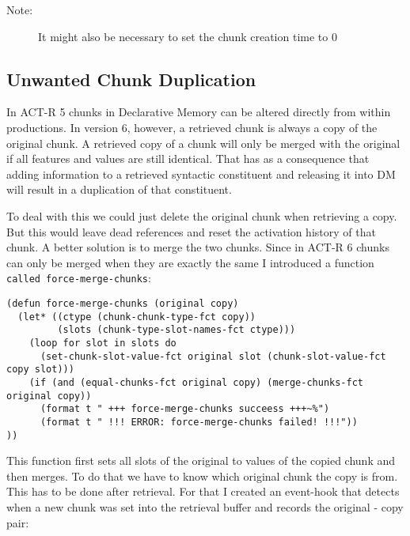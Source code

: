 \documentclass[nobf,fignum,doc,longtable]{apa}
\begin{document}
\begin{description}
\item[Note:] It might also be necessary to set the chunk creation time to 0
\end{description}

\subsection{Unwanted Chunk Duplication}
In ACT-R 5 chunks in Declarative Memory can be altered directly from within productions. In version 6, however, a retrieved chunk is always a copy of the original chunk. A retrieved copy of a chunk will only be merged with the original if all features and values are still identical. That has as a consequence that adding information to a retrieved syntactic constituent and releasing it into DM will result in a duplication of that constituent.

To deal with this we could just delete the original chunk when retrieving a copy. But this would leave dead references and reset the activation history of that chunk. 
A better solution is to merge the two chunks. Since in ACT-R 6 chunks can only be merged when they are exactly the same I introduced a function \texttt{called force-merge-chunks}:

{\scriptsize \begin{verbatim}
(defun force-merge-chunks (original copy)
  (let* ((ctype (chunk-chunk-type-fct copy))
         (slots (chunk-type-slot-names-fct ctype)))
    (loop for slot in slots do
      (set-chunk-slot-value-fct original slot (chunk-slot-value-fct copy slot)))
    (if (and (equal-chunks-fct original copy) (merge-chunks-fct original copy))
      (format t " +++ force-merge-chunks succeess +++~%")
      (format t " !!! ERROR: force-merge-chunks failed! !!!"))
))
\end{verbatim}
}

This function first sets all slots of the original to values of the copied chunk and then merges. 
To do that we have to know which original chunk the copy is from. This has to be done after retrieval. For that I created an event-hook that detects when a new chunk was set into the retrieval buffer and records the original - copy pair:
\end{document}
